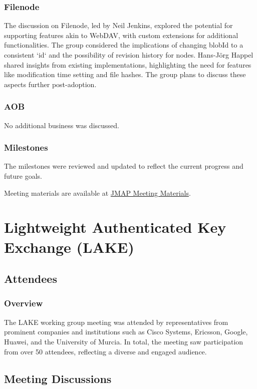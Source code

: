 \documentclass{article}
\begin{document}
\subsubsection{Filenode}
The discussion on Filenode, led by Neil Jenkins, explored the potential for supporting features akin to WebDAV, with custom extensions for additional functionalities. The group considered the implications of changing blobId to a consistent `id` and the possibility of revision history for nodes. Hans-Jörg Happel shared insights from existing implementations, highlighting the need for features like modification time setting and file hashes. The group plans to discuss these aspects further post-adoption.

\subsubsection{AOB}
No additional business was discussed.

\subsubsection{Milestones}
The milestones were reviewed and updated to reflect the current progress and future goals.

Meeting materials are available at \href{https://example.com/jmap-meeting-materials}{JMAP Meeting Materials}.



\newpage

\section{Lightweight Authenticated Key Exchange (LAKE)}

\subsection{Attendees}
\subsubsection{Overview}
The LAKE working group meeting was attended by representatives from prominent companies and institutions such as Cisco Systems, Ericsson, Google, Huawei, and the University of Murcia. In total, the meeting saw participation from over 50 attendees, reflecting a diverse and engaged audience.

\subsection{Meeting Discussions}
\end{document}
